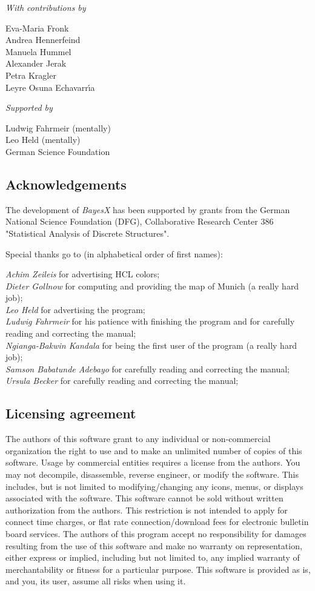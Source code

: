 \documentclass[11pt,a4paper,twoside]{bayesxarticle}
\begin{document}
{\em With contributions by}

Eva-Maria Fronk\\
Andrea Hennerfeind\\
Manuela Hummel\\
Alexander Jerak\\
Petra Kragler\\
Leyre Osuna Echavarr\'{\i}a

{\em Supported by}

Ludwig Fahrmeir (mentally)\\
Leo Held (mentally)\\
German Science Foundation

\newpage

\subsection*{Acknowledgements}

The development of {\em BayesX} has been supported by grants from
the German National Science Foundation (DFG), Collaborative Research
Center 386 "Statistical Analysis of Discrete Structures".

Special thanks go to (in alphabetical order of first names):

{\em Achim Zeileis} for advertising HCL colors; \\
{\em Dieter Gollnow} for computing and providing the map of Munich (a really hard job); \\
{\em Leo Held} for advertising the program; \\
{\em Ludwig Fahrmeir} for his patience with finishing the program
and for carefully
reading and correcting the  manual; \\
{\em Ngianga-Bakwin Kandala} for being the first user of the program (a really hard job); \\
{\em Samson Babatunde Adebayo} for carefully reading and correcting the manual; \\
{\em Ursula Becker} for carefully reading and correcting the manual;

\subsection*{Licensing agreement} The authors of this software grant
to any individual or non-commercial organization the right to use
and to make an unlimited number of copies of this software. Usage by
commercial entities requires a license from the authors. You may not
decompile, disassemble, reverse engineer, or modify the software.
This includes, but is not limited to modifying/changing any icons,
menus, or displays associated with the software. This software
cannot be sold without written authorization from the authors. This
restriction is not intended to apply for connect time charges, or
flat rate connection/download fees for electronic bulletin board
services. The authors of this program accept no responsibility for
damages resulting from the use of this software and make no warranty
on representation, either express or implied, including but not
limited to, any implied warranty of merchantability or fitness for a
particular purpose. This software is provided as is, and you, its
user, assume all risks when using it.
\end{document}
